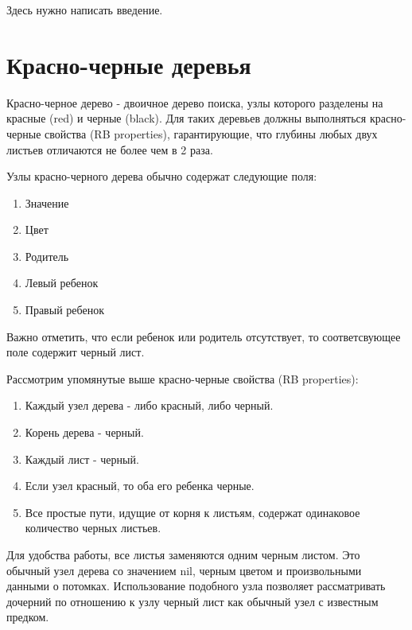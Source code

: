 





\Intro

Здесь нужно написать введение.

\section{Красно-черные деревья}

Красно-черное дерево - двоичное дерево поиска, узлы которого 
разделены на красные (red) и черные (black). Для таких деревьев
должны выполняться красно-черные свойства (RB properties), 
гарантирующие, что глубины любых двух листьев отличаются не более
чем в 2 раза.

Узлы красно-черного дерева обычно содержат следующие поля:
\begin{enumerate}
	\item Значение
	\item Цвет
	\item Родитель
	\item Левый ребенок
	\item Правый ребенок
\end{enumerate}	

Важно отметить, что если ребенок или родитель отсутствует, то
соответсвующее поле содержит черный лист.

Рассмотрим упомянутые выше красно-черные свойства (RB properties):
\begin{enumerate}
	\item Каждый узел дерева - либо красный, либо черный.
	\item Корень дерева - черный.
	\item Каждый лист - черный.
	\item Если узел красный, то оба его ребенка черные.
	\item Все простые пути, идущие от корня к листьям, содержат 
		  одинаковое количество черных листьев.
\end{enumerate}

Для удобства работы, все листья заменяются одним черным листом.
Это обычный узел дерева со значением nil, черным цветом и произвольными данными
о потомках. Использование подобного узла позволяет рассматривать дочерний 
по отношению к узлу черный лист как обычный узел с известным предком.

